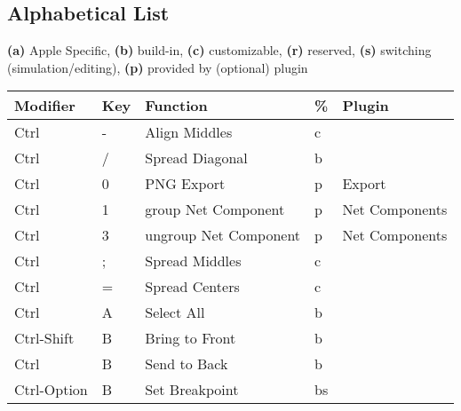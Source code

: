 \subsection*{Alphabetical List}

\textbf{(a)} Apple Specific, \textbf{(b)} build-in, \textbf{(c)} customizable,
\textbf{(r)} reserved, \textbf{(s)} switching (simulation/editing), \textbf{(p)}
provided by (optional) plugin

\begin{longtable}{|l|l|l|l|l|}
\hline

Modifier     & Key & Function                  & \% & Plugin         \\ \hline 
Ctrl         & -   & Align Middles             & c  &                \\ \hline 
Ctrl         & /   & Spread Diagonal           & b  &                \\ \hline 
Ctrl         & 0   & PNG Export                & p  & Export         \\ \hline 
Ctrl         & 1   & group Net Component       & p  & Net Components \\ \hline 
Ctrl         & 3   & ungroup Net Component     & p  & Net Components \\ \hline 
Ctrl         & ;   & Spread Middles            & c  &                \\ \hline 
Ctrl         & =   & Spread Centers            & c  &                \\ \hline 
Ctrl         & A   & Select All                & b  &                \\ \hline 
Ctrl-Shift   & B   & Bring to Front            & b  &                \\ \hline 
Ctrl         & B   & Send to Back              & b  &                \\ \hline 
Ctrl-Option  & B   & Set Breakpoint            & bs &                \\ \hline 

\end{longtable}
